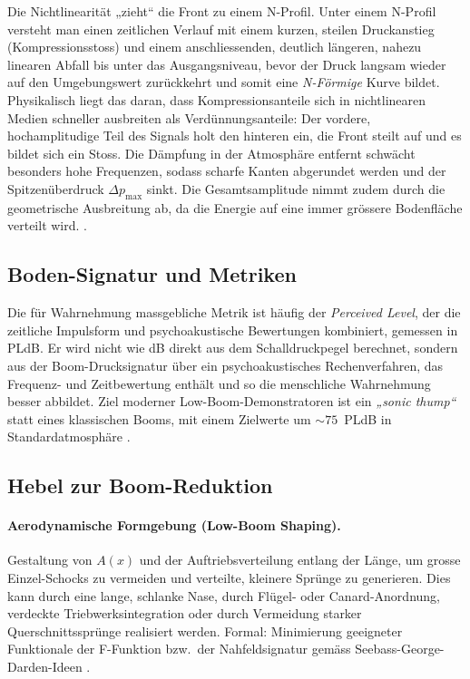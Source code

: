 Die Nichtlinearität „zieht“ die Front zu einem N-Profil.
Unter einem N-Profil versteht man einen zeitlichen Verlauf mit einem kurzen,
steilen Druckanstieg (Kompressionsstoss) und einem anschliessenden, deutlich
längeren, nahezu linearen Abfall bis unter das Ausgangsniveau, bevor der
Druck langsam wieder auf den Umgebungswert zurückkehrt und somit eine
\emph{N-Förmige} Kurve bildet.
Physikalisch liegt das daran, dass Kompressionsanteile sich in nichtlinearen
Medien schneller ausbreiten als Verdünnungsanteile: Der vordere,
hochamplitudige Teil des Signals holt den hinteren ein, die Front steilt
auf und es bildet sich ein Stoss.
Die Dämpfung in der Atmosphäre entfernt schwächt besonders hohe Frequenzen,
sodass scharfe Kanten abgerundet werden und der Spitzenüberdruck
\(\Delta p_\mathrm{max}\) sinkt.
Die Gesamtsamplitude nimmt zudem durch die geometrische Ausbreitung ab, da
die Energie auf eine immer grössere Bodenfläche verteilt wird.
\cite{schall:rallabhandi2023,schall:rallabhandiAIAA2023,schall:burgersJASA}.

\subsection{Boden-Signatur und Metriken}
Die für Wahrnehmung massgebliche Metrik ist häufig der \textit{Perceived Level},
der die zeitliche Impulsform und psychoakustische Bewertungen kombiniert,
gemessen in PLdB.
Er wird nicht wie dB direkt aus dem Schalldruckpegel berechnet,
sondern aus der Boom-Drucksignatur über ein psychoakustisches Rechenverfahren,
das Frequenz- und Zeitbewertung enthält und so die menschliche
Wahrnehmung besser abbildet.
Ziel moderner Low-Boom-Demonstratoren ist ein \emph{„sonic thump“} statt
eines klassischen Booms, mit einem Zielwerte um
${\sim}75$\ PLdB in Standardatmosphäre \cite{schall:x59pldb}.

\subsection{Hebel zur Boom-Reduktion}
\paragraph{Aerodynamische Formgebung (Low-Boom Shaping).}
Gestaltung von $A(x)$ und der Auftriebsverteilung entlang der Länge,
um grosse Einzel-Schocks zu vermeiden und verteilte, kleinere Sprünge zu generieren.
Dies kann durch eine lange, schlanke Nase, durch Flügel- oder Canard-Anordnung,
verdeckte Triebwerksintegration oder durch Vermeidung starker
Querschnittssprünge realisiert werden.
Formal: Minimierung geeigneter Funktionale der F-Funktion bzw.\ der Nahfeldsignatur
gemäss Seebass-George-Darden-Ideen \cite{schall:seebassgeorge,schall:darden75}.

